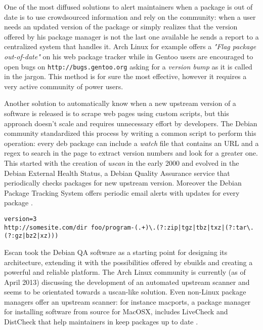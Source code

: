 One of the most diffused solutions to alert maintainers when a package is out of date is to use crowdsourced information and rely on the community: when a user needs an updated version of the package or simply realizes that the version offered by his package manager is not the last one available he sends a report to a centralized system that handles it. Arch Linux for example offers a \emph{"Flag package out-of-date"} on his web package tracker \cite{arch_flaghelp} while in Gentoo users are encouraged to open bugs on \texttt{http://bugs.gentoo.org} asking for a \emph{version bump} as it is called in the jargon. This method is for sure the most effective, however it requires a very active community of power users.

Another solution to automatically know when a new upstream version of a software is released is to scrape web pages using custom scripts, but this approach doesn't scale and requires unnecessary effort by developers.
The Debian community standardized this process by writing a common script to perform this operation: every deb package can include a \emph{watch} file that contains an URL and a regex to search in the page to extract version numbers and look for a greater one.
This started with the creation of \emph{uscan} in the early 2000 and evolved in the Debian External Health Status, a Debian Quality Assurance service that periodically checks packages for new upstream version. Moreover the Debian Package Tracking System offers periodic email alerts with updates for every package \cite{debian_qa}.

\vspace{0.5cm}
\lstset{caption=Example of a watch file, label=watch file, numbers=left, stepnumber=1, frame=single, breaklines=true}
\begin{lstlisting}
version=3
http://somesite.com/dir foo/program-(.+)\.(?:zip|tgz|tbz|txz|(?:tar\.(?:gz|bz2|xz)))
\end{lstlisting}
\vspace{0.5cm}

Escan took the Debian QA software as a starting point for designing its architecture, extending it with the possibilities offered by ebuilds and creating a powerful and reliable platform.
The Arch Linux community is currently (as of April 2013) discussing the development of an automated upstream scanner \cite{arch_scanner} and seems to be orientated towards a uscan-like solution.
Even non-Linux package managers offer an upstream scanner: for instance macports, a package manager for installing software from source for MacOSX, includes LiveCheck and DistCheck that help maintainers in keep packages up to date \cite{macports_livecheck}.